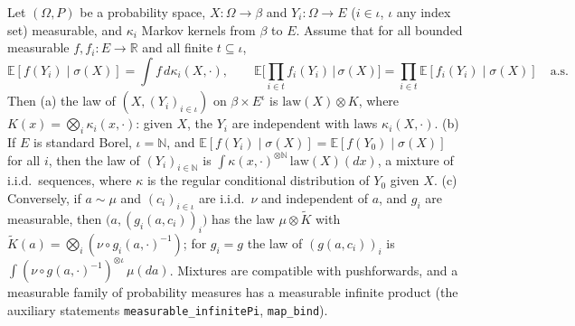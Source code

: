 \begin{lemma}\label{lem:sg:cond-iid}
  \leanok
Let $(\Omega,P)$ be a probability space, $X:\Omega\to\beta$ and $Y_i:\Omega\to E$ ($i\in\iota$, $\iota$ any index set) measurable, and $\kappa_i$ Markov kernels from $\beta$ to $E$. Assume that for all bounded measurable $f,f_i:E\to\mathbb R$ and all finite $t\subseteq\iota$,
\[\mathbb E[f(Y_i)\mid\sigma(X)]=\int f\,d\kappa_i(X,\cdot),\qquad
\mathbb E\Big[\prod_{i\in t}f_i(Y_i)\,\Big|\,\sigma(X)\Big]=\prod_{i\in t}\mathbb E[f_i(Y_i)\mid\sigma(X)]\quad\text{a.s.}\]
Then (a) the law of $(X,(Y_i)_{i\in\iota})$ on $\beta\times E^{\iota}$ is $\mathrm{law}(X)\otimes K$, where $K(x)=\bigotimes_i\kappa_i(x,\cdot)$: given $X$, the $Y_i$ are independent with laws $\kappa_i(X,\cdot)$.
(b) If $E$ is standard Borel, $\iota=\mathbb N$, and $\mathbb E[f(Y_i)\mid\sigma(X)]=\mathbb E[f(Y_0)\mid\sigma(X)]$ for all $i$, then the law of $(Y_i)_{i\in\mathbb N}$ is
$\int\kappa(x,\cdot)^{\otimes\mathbb N}\,\mathrm{law}(X)(dx)$, a mixture of i.i.d.\ sequences, where $\kappa$ is the regular conditional distribution of $Y_0$ given $X$.
(c) Conversely, if $a\sim\mu$ and $(c_i)_{i\in\iota}$ are i.i.d.\ $\nu$ and independent of $a$, and $g_i$ are measurable, then $\big(a,(g_i(a,c_i))_i\big)$ has the law $\mu\otimes\tilde K$ with $\tilde K(a)=\bigotimes_i(\nu\circ g_i(a,\cdot)^{-1})$; for $g_i=g$ the law of
$(g(a,c_i))_{i}$ is $\int(\nu\circ g(a,\cdot)^{-1})^{\otimes\iota}\,\mu(da)$. Mixtures are compatible with pushforwards, and a measurable family of probability measures has a measurable infinite product (the auxiliary statements \texttt{measurable\_infinitePi}, \texttt{map\_bind}).
\end{lemma}

